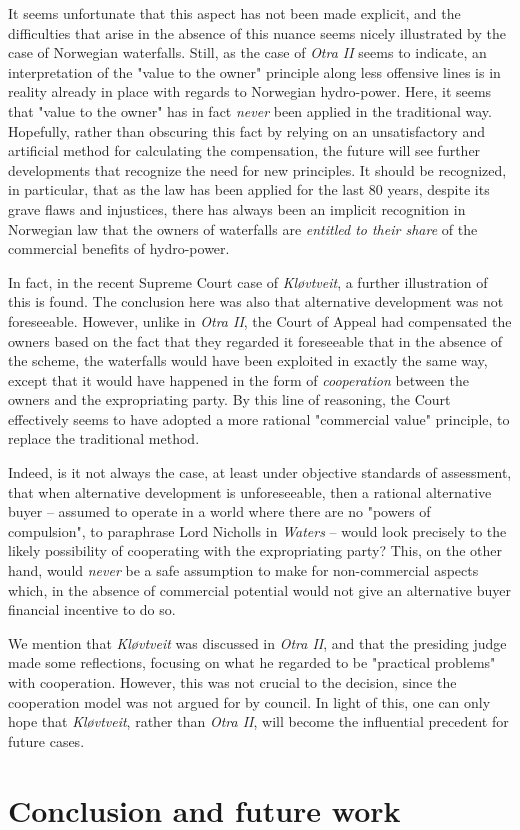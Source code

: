 It seems unfortunate that this aspect has not been made explicit, and the difficulties that arise in the absence of this nuance seems nicely illustrated by the case of Norwegian waterfalls. Still, as the case of \emph{Otra II} seems to indicate, an interpretation of the "value to the owner" principle along less offensive lines is in reality already in place with regards to Norwegian hydro-power. Here, it seems that "value to the owner" has in fact \emph{never} been applied in the traditional way. Hopefully, rather than obscuring this fact by relying on an unsatisfactory and artificial method for calculating the compensation, the future will see further developments that recognize the need for new principles. It should be recognized, in particular, that as the law has been applied for the last 80 years, despite its grave flaws and injustices, there has always been an implicit recognition in Norwegian law that the owners of waterfalls are \emph{entitled to their share} of the commercial benefits of hydro-power. 

In fact, in the recent Supreme Court case of \emph{Kløvtveit}, a further illustration of this is found. The conclusion here was also that alternative development was not foreseeable. However, unlike in \emph{Otra II}, the Court of Appeal had compensated the owners based on the fact that they regarded it foreseeable that in the absence of the scheme, the waterfalls would have been exploited in exactly the same way, except that it would have happened in the form of \emph{cooperation} between the owners and the expropriating party. By this line of reasoning, the Court effectively seems to have adopted a more rational "commercial value" principle, to replace the traditional method. 

Indeed, is it not always the case, at least under objective standards of assessment, that when alternative development is unforeseeable, then a rational alternative buyer -- assumed to operate in a world where there are no "powers of compulsion", to paraphrase Lord Nicholls in \emph{Waters} -- would look precisely to the likely possibility of cooperating with the expropriating party? This, on the other hand, would \emph{never} be a safe assumption to make for non-commercial aspects which, in the absence of commercial potential would not give an alternative buyer financial incentive to do so.

We mention that \emph{Kløvtveit} was discussed in \emph{Otra II}, and that the presiding judge made some reflections, focusing on what he regarded to be "practical problems" with cooperation. However, this was not crucial to the decision, since the cooperation model was not argued for by council. In light of this, one can only hope that \emph{Kløvtveit}, rather than \emph{Otra II}, will become the influential precedent for future cases.

\section{Conclusion and future work}\label{sec:conc}


